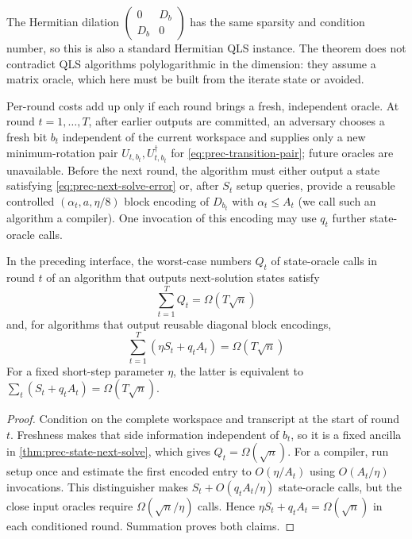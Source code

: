 The Hermitian dilation
$\left(\begin{smallmatrix}0&D_b\\D_b&0\end{smallmatrix}\right)$ has the
same sparsity and condition number, so this is also a standard Hermitian QLS
instance.  The theorem does not contradict QLS algorithms polylogarithmic
in the dimension: they assume a matrix oracle, which here must be built from
the iterate state or avoided.

Per-round costs add up only if each round brings a fresh, independent
oracle.  At round
$t=1,\ldots,T$, after earlier outputs are committed, an adversary chooses a
fresh bit $b_t$ independent of the current workspace and supplies only a new
minimum-rotation pair $U_{t,b_t},U_{t,b_t}^\dagger$ for
\eqref{eq:prec-transition-pair}; future oracles are unavailable.  Before the
next round, the algorithm must either output a state satisfying
\eqref{eq:prec-next-solve-error} or, after $S_t$ setup queries, provide a
reusable controlled $(\alpha_t,a,\eta/8)$ block encoding of $D_{b_t}$ with
$\alpha_t\leq A_t$ (we call such an algorithm a compiler).  One invocation of
this encoding may use $q_t$ further state-oracle calls.

\begin{theorem}
\label{thm:prec-online-direct-sum}
In the preceding interface, the worst-case numbers $Q_t$ of state-oracle
calls in round $t$ of an algorithm that outputs next-solution states satisfy
\begin{equation}
 \sum_{t=1}^TQ_t=\Omega(T\sqrt n)                         \label{eq:prec-online-solves}
\end{equation}
and, for algorithms that output reusable diagonal block encodings,
\begin{equation}
 \boxed{\sum_{t=1}^T(\eta S_t+q_tA_t)=\Omega(T\sqrt n)}  \label{eq:prec-online-compilers}
\end{equation}
For a fixed short-step parameter $\eta$, the latter is equivalent to
$\sum_t(S_t+q_tA_t)=\Omega(T\sqrt n)$.
\end{theorem}

\begin{proof}
Condition on the complete workspace and transcript at the start of round
$t$.  Freshness makes that side information independent of $b_t$, so it is a
fixed ancilla in \cref{thm:prec-state-next-solve}, which gives
$Q_t=\Omega(\sqrt n)$.  For a compiler, run setup once and estimate the first
encoded entry to $O(\eta/A_t)$ using $O(A_t/\eta)$ invocations.  This
distinguisher makes $S_t+O(q_tA_t/\eta)$ state-oracle calls, but the close
input oracles require $\Omega(\sqrt n/\eta)$ calls.  Hence
$\eta S_t+q_tA_t=\Omega(\sqrt n)$ in each conditioned round.  Summation
proves both claims.
\end{proof}

